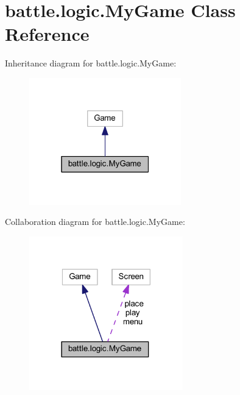 \hypertarget{classbattle_1_1logic_1_1_my_game}{}\section{battle.\+logic.\+My\+Game Class Reference}
\label{classbattle_1_1logic_1_1_my_game}


Inheritance diagram for battle.\+logic.\+My\+Game\+:
\nopagebreak
\begin{figure}[H]
\begin{center}
\leavevmode
\includegraphics[width=187pt]{classbattle_1_1logic_1_1_my_game__inherit__graph}
\end{center}
\end{figure}


Collaboration diagram for battle.\+logic.\+My\+Game\+:
\nopagebreak
\begin{figure}[H]
\begin{center}
\leavevmode
\includegraphics[width=189pt]{classbattle_1_1logic_1_1_my_game__coll__graph}
\end{center}
\end{figure}
